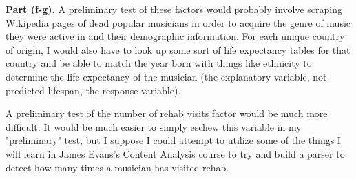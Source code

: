 \documentclass[letterpaper,12pt]{article}
\theoremstyle{definition}
\begin{document}
\noindent\textbf{Part (f-g).}
A preliminary test of these factors would probably involve scraping Wikipedia pages of dead popular musicians in order to acquire the genre of music they were active in and their demographic information. For each unique country of origin, I would also have to look up some sort of life expectancy tables for that country and be able to match the year born with things like ethnicity to determine the life expectancy of the musician (the explanatory variable, not predicted lifespan, the response variable).

A preliminary test of the number of rehab visits factor would be much more difficult. It would be much easier to simply eschew this variable in my "preliminary" test, but I suppose I could attempt to utilize some of the things I will learn in James Evans's Content Analysis course to try and build a parser to detect how many times a musician has visited rehab.
\end{document}
